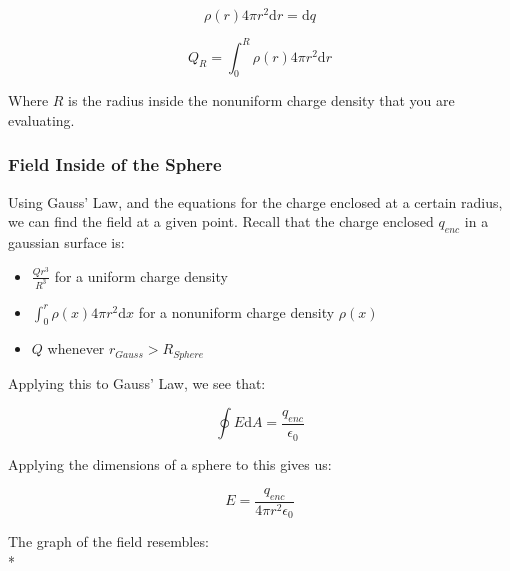 \documentclass[a4paper,12pt]{article}
\begin{document}
								\begin{equation*}
										\rho(r) 4 \pi r^{2} \mathrm{d}r = \mathrm{d}q
								\end{equation*}

								\begin{equation*}
										Q_{R} = \int_{0}^{R} \rho(r) 4 \pi r^{2} \mathrm{d}r 
								\end{equation*}

								Where $R$ is the radius inside the nonuniform charge density that you are evaluating.
						\subsubsection{Field Inside of the Sphere}
								Using Gauss' Law, and the equations for the charge enclosed at a certain radius, we can find the field at a given point. Recall that the charge enclosed $q_{enc}$ in a gaussian surface is:
								\begin{itemize}
										\item $\frac{Qr^{3}}{R^{3}}$ for a uniform charge density
										\item $\int_{0}^{r} \rho(x) 4 \pi r^{2} \mathrm{d}x$ for a nonuniform charge density $\rho(x)$ 
										\item $Q$ whenever $r_{Gauss} > R_{Sphere}$
								\end{itemize}

								Applying this to Gauss' Law, we see that:

								\begin{equation*}
										\oint E \mathrm{d}A = \frac{q_{enc}}{\epsilon_{0}}
								\end{equation*}

								Applying the dimensions of a sphere to this gives us:

								\begin{equation*}
										E = \frac{q_{enc}}{4 \pi r^{2} \epsilon_{0}}
								\end{equation*}

								The graph of the field resembles:\\*
\end{document}
